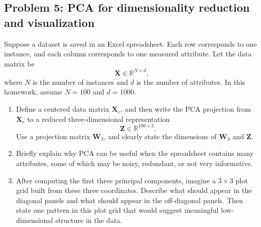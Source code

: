 \documentclass[12pt]{article}
\begin{document}
\newpage 


\subsection*{Problem 5: PCA for dimensionality reduction and visualization}
Suppose a dataset is saved in an Excel spreadsheet. Each row corresponds to one instance, and each column corresponds to one measured attribute. Let the data matrix be
\[
\bm{X} \in \mathbb{R}^{N\times d},
\]
where \(N\) is the number of instances and \(d\) is the number of attributes. In this homework, assume \(N=100\) and \(d=1000\).
\begin{enumerate}
    \renewcommand{\labelenumi}{(\alph{enumi})}
    \item Define a centered data matrix \(\bm{X}_c\), and then write the PCA projection from \(\bm{X}_c\) to a reduced three-dimensional representation
    \[
    \bm{Z} \in \mathbb{R}^{100\times 3}.
    \]
    Use a projection matrix \(\bm{W}_3\), and clearly state the dimensions of \(\bm{W}_3\) and \(\bm{Z}\).
    
    \vspace{24pt}
    \fullunderline
    
    \item Briefly explain why PCA can be useful when the spreadsheet contains many attributes, some of which may be noisy, redundant, or not very informative.
    
    \vspace{20pt}
    \fullunderline
    
    \vspace{20pt}
    \fullunderline
    
    \item After computing the first three principal components, imagine a \(3\times 3\) plot grid built from these three coordinates. Describe what should appear in the diagonal panels and what should appear in the off-diagonal panels. Then state one pattern in this plot grid that would suggest meaningful low-dimensional structure in the data.
    
    \vspace{20pt}
    \fullunderline
    
    \vspace{20pt}
    \fullunderline
\end{enumerate}
\end{document}
